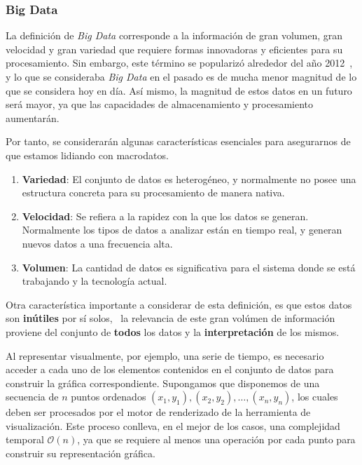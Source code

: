 \subsubsection{Big Data}

La definición de \textit{Big Data} corresponde a la información de gran volumen, gran velocidad y gran variedad que requiere formas innovadoras y eficientes para su procesamiento. Sin embargo, este término se popularizó alrededor del año 2012~\cite{diebold2012bigdata}, y lo que se consideraba \textit{Big Data} en el pasado es de mucha menor magnitud de lo que se considera hoy en día. Así mismo, la magnitud de estos datos en un futuro será mayor, ya que las capacidades de almacenamiento y procesamiento aumentarán.

Por tanto, se considerarán algunas características esenciales para asegurarnos de que estamos lidiando con macrodatos.
\begin{enumerate}
    \item \textbf{Variedad}:         El conjunto de datos es heterogéneo, y normalmente no posee una estructura concreta para su procesamiento de manera nativa.
    \item \textbf{Velocidad}: 
        Se refiera a la rapidez con la que los datos se generan. Normalmente los tipos de datos a analizar están en tiempo real, y generan nuevos datos a una frecuencia alta.
    \item \textbf{Volumen}: 
        La cantidad de datos es significativa para el sistema donde se está trabajando y la tecnología actual.
\end{enumerate}

Otra característica importante a considerar de esta definición, es que estos datos son \textbf{inútiles} por sí solos,~\cite{gandomi2015beyond} la relevancia de este gran volúmen de información proviene del conjunto de \textbf{todos} los datos y la \textbf{interpretación} de los mismos. 

Al representar visualmente, por ejemplo, una serie de tiempo, es necesario acceder a cada uno de los elementos contenidos en el conjunto de datos para construir la gráfica correspondiente. Supongamos que disponemos de una secuencia de \( n \) puntos ordenados \((x_1, y_1), (x_2, y_2), \ldots, (x_n, y_n)\), los cuales deben ser procesados por el motor de renderizado de la herramienta de visualización. Este proceso conlleva, en el mejor de los casos, una complejidad temporal \(\mathcal{O}(n)\), ya que se requiere al menos una operación por cada punto para construir su representación gráfica.

